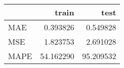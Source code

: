 \begin{tabular}{lrr}
\toprule
{} &      train &       test \\
\midrule
MAE  &   0.393826 &   0.549828 \\
MSE  &   1.823753 &   2.691028 \\
MAPE &  54.162290 &  95.209532 \\
\bottomrule
\end{tabular}
